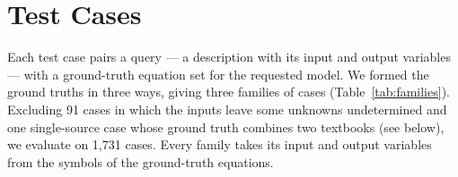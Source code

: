 \section{Test Cases}
\label{sec:cases}

Each test case pairs a query --- a description with its input and output variables --- with a
ground-truth equation set for the requested model. We formed the ground truths in three ways,
giving three families of cases (Table~\ref{tab:families}). Excluding 91 cases in which the inputs
leave some unknowns undetermined and one single-source case whose ground truth combines two
textbooks (see below), we evaluate on 1,731 cases. Every family takes its input and output
variables from the symbols of the ground-truth equations.

